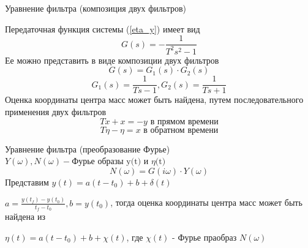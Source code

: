 \documentclass[10pt]{beamer}
\begin{document}
\begin{frame}{Уравнение фильтра (композиция двух фильтров)}

Передаточная функция системы (\ref*{eta_y}) имеет вид 
\[
	G(s)=-\frac{1}{T^2s^2-1}
\]
Ее можно представить в виде композиции двух фильтров
\[
	G(s)=G_1(s)\cdot G_2(s) 
\]
\[
	G_1(s)=\frac{1}{Ts-1}, G_2(s)=\frac{1}{Ts+1}
\]
Оценка координаты центра масс может быть найдена, путем последовательного применения двух фильтров \cite{podoprihin}
\[
	T \dot{x}+x=-y \text{ в прямом времени}
\]
\[
	T \dot{\eta}-\eta=x \text{ в обратном времени}
\]

\end{frame}

\begin{frame}{Уравнение фильтра (преобразование Фурье)}
	$Y(\omega),N(\omega) - \text{Фурье образы y(t) и $\eta$(t)}$
	\[
		N(\omega)=G(i\omega)\cdot Y(\omega)
	\]
	Представим $y(t)=a(t-t_0)+b+\delta(t)$ 

	$a=\frac{y(t_f)-y(t_0)}{t_f-t_0}, b=y(t_0)$, тогда оценка координаты центра масс может быть найдена из

	$\eta(t)=a(t-t_0)+b+\chi(t)$, где $\chi(t)$ - Фурье праобраз $N(\omega)$
	
\end{frame}
\end{document}
